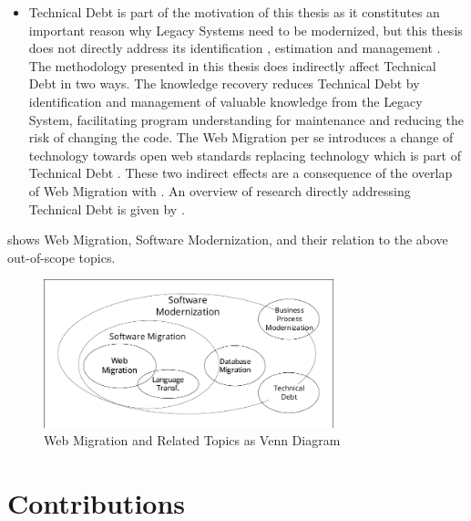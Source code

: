 \begin{itemize}
\item
  \gls{Technical Debt} is part of the motivation of this thesis as it constitutes an important reason why \glspl{Legacy System} need to be modernized, but this thesis does not directly address its identification \autocite{Li2015TDSMS}, estimation \autocite{Curtis2012EstimatingTD} and management \autocite{Yli-Huumo2016TD,Li2015TDSMS}.
The methodology presented in this thesis does indirectly affect \gls{Technical Debt} in two ways.
The knowledge recovery reduces \gls{Technical Debt} by identification and management of valuable knowledge from the \gls{Legacy System}, facilitating program understanding for maintenance and reducing the risk of changing the code.
The \gls{Web Migration} per se introduces a change of technology towards open \Gls{web} standards replacing  technology which is part of \gls{Technical Debt} \autocite{Yli-Huumo2016TD}.
These two indirect effects are a consequence of the overlap of \gls{Web Migration} with .
An overview of research directly addressing \gls{Technical Debt} is given by \citet{Li2015TDSMS}.
\end{itemize}

 shows \gls{Web Migration}, \gls{Software Modernization}, and their relation to the above out-of-scope topics.

\begin{figure}
\hypertarget{fig:modernization-migration}{%
\centering
\includegraphics[width=0.75\textwidth]{../figures/modernization-migration.pdf}
\caption{\gls{Web Migration} and Related Topics as Venn Diagram}\label{fig:modernization-migration}
}
\end{figure}

\hypertarget{contributions}{%
\section{Contributions}\label{sec:introduction.contributions}}

